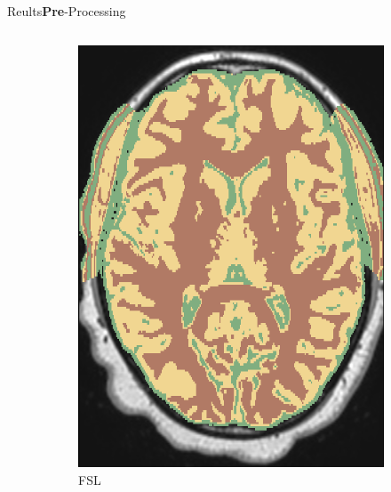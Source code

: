 \documentclass[]{standalone}
\begin{document}
\begin{frame}{Reults}{\textbf{Pre}-Processing}
\begin{columns}
\begin{column}{0.55\textwidth}
\begin{figure}[h!]
\begin{subfigure}[h!]{0.32\textwidth}
				     \includegraphics[scale=0.11]{./IMG/FSL_SEG54.png}
				     \caption*{FSL}
				\end{subfigure}
				\hfill
				\begin{subfigure}[h!]{0.32\textwidth}

\end{subfigure}
\end{figure}
\end{column}
\end{columns}
\end{frame}
\end{document}
